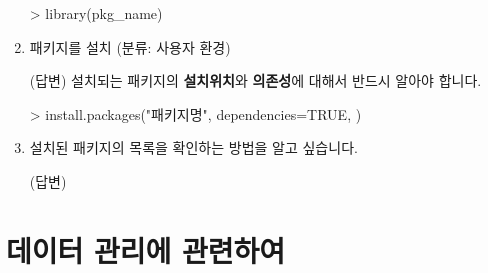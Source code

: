 \documentclass{article}
\begin{document}
\begin{enumerate}
	\begin{Schunk}
	\begin{Soutput}
	> library(pkg_name)	
	\end{Soutput}
	\end{Schunk}

	\item 패키지를 설치 (분류: 사용자 환경)  
	
	\textsf{(답변)} 설치되는 패키지의 \textbf{설치위치}와 \textbf{의존성}에 대해서 반드시 알아야 합니다. 
	\begin{Schunk}
	\begin{Soutput}
	> install.packages("패키지명", dependencies=TRUE, )
	\end{Soutput}
	\end{Schunk}

	\item 설치된 패키지의 목록을 확인하는 방법을 알고 싶습니다.
	
	\textsf{(답변)} 



\end{enumerate}




\section{데이터 관리에 관련하여}
\end{document}
